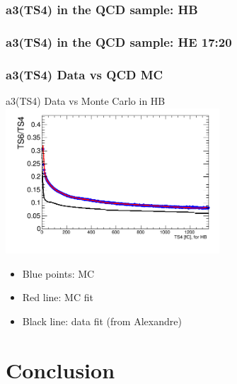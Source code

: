 \documentclass[bigger]{beamer}
\begin{document}
\begin{frame}
\frametitle{a3(TS4) in the QCD sample: HB}
\label{sec-3-6-2}
\label{sec-3-6-2-1}

\begin{center}
\resizebox*{!}{0.75\textheight}{

}
\end{center}
\end{frame}
\begin{frame}
\frametitle{a3(TS4) in the QCD sample: HE 17:20}
\label{sec-3-6-3}
\label{sec-3-6-3-1}

\begin{center}
\resizebox*{!}{0.75\textheight}{

}
\end{center}
\end{frame}
\begin{frame}
\frametitle{a3(TS4) Data vs QCD MC}
\label{sec-3-6-4}
\label{sec-3-6-4-1}

\centering
a3(TS4) Data vs Monte Carlo in HB
\includegraphics[width=0.6\textwidth]{fig/a2_ring0_daata.png}
\label{sec-3-6-4-2}
\begin{itemize}

\item Blue points: MC
\label{sec-3-6-4-2-1}%

\item Red line: MC fit
\label{sec-3-6-4-2-2}%

\item Black line: data fit (from Alexandre)
\label{sec-3-6-4-2-3}%
\end{itemize} %
\end{frame}
\section{Conclusion}
\label{sec-4}
\end{document}
